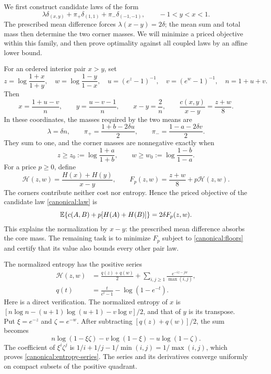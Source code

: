 We first construct candidate laws of the form
\begin{equation}
 \lambda\delta_{(x,y)}
 +\pi_+\delta_{(1,1)}+\pi_-\delta_{(-1,-1)},\qquad -1<y<x<1.
 \label{canonical:law}
\end{equation}
The prescribed mean difference forces $\lambda(x-y)=2\delta$;
the mean sum and total mass then determine the two corner masses.
We will minimize a priced objective within this family, and then
prove optimality against all coupled laws by an affine lower bound.

For an ordered interior pair $x>y$, set
\[
 z=\log\frac{1+x}{1+y},\quad
 w=\log\frac{1-y}{1-x},\quad
 u=(e^z-1)^{-1},\quad v=(e^w-1)^{-1},\quad n=1+u+v.
\]
Then
\begin{equation}
 x=\frac{1+u-v}{n},\qquad
 y=\frac{u-v-1}{n},\qquad x-y=\frac2n,\qquad
 \frac{c(x,y)}{x-y}=\frac{z+w}{8}.
 \label{canonical:coordinates}
\end{equation}
In these coordinates, the masses required by the two means are
\begin{equation}
 \lambda=\delta n,\qquad
 \pi_+=\frac{1+b-2\delta u}{2},\qquad
 \pi_-=\frac{1-a-2\delta v}{2}.
 \label{canonical:masses}
\end{equation}
They sum to one, and the corner masses are nonnegative exactly when
\begin{equation}
 z\ge z_0:=\log\frac{1+a}{1+b},\qquad
 w\ge w_0:=\log\frac{1-b}{1-a}.
 \label{canonical:floors}
\end{equation}
For a price $p\ge0$, define
\[
 \mathcal H(z,w)=\frac{H(x)+H(y)}{x-y},\qquad
 F_p(z,w)=\frac{z+w}{8}+p\mathcal H(z,w).
\]
The corners contribute neither cost nor entropy. Hence the priced
objective of the candidate law \eqref{canonical:law} is
\begin{equation}
 \mathbb E\{c(A,B)+p[H(A)+H(B)]\}=2\delta F_p(z,w).
 \label{canonical:candidate-value}
\end{equation}
This explains the normalization by $x-y$: the prescribed mean
difference absorbs the core mass. The remaining task is to minimize
$F_p$ subject to \eqref{canonical:floors} and certify that its value
also bounds every other pair law.

The normalized entropy has the positive series
\begin{equation}
\begin{split}
 \mathcal H(z,w)
 &=\frac{q(z)+q(w)}2+
 \sum_{i,j\ge1}\frac{e^{-iz-jw}}{\max(i,j)},\\
 q(t)&=\frac{t}{e^t-1}-\log(1-e^{-t}).
\end{split}
 \label{canonical:entropy-series}
\end{equation}
Here is a direct verification.  The normalized entropy of $x$ is
$[n\log n-(u+1)\log(u+1)-v\log v]/2$, and that of $y$ is its
transpose.  Put $\xi=e^{-z}$ and $\zeta=e^{-w}$.  After subtracting
$[q(z)+q(w)]/2$, the sum becomes
\[
 n\log(1-\xi\zeta)-v\log(1-\xi)-u\log(1-\zeta).
\]
The coefficient of $\xi^i\zeta^j$ is
$1/i+1/j-1/\min(i,j)=1/\max(i,j)$, which proves
\eqref{canonical:entropy-series}.  The series and its derivatives
converge uniformly on compact subsets of the positive quadrant.

